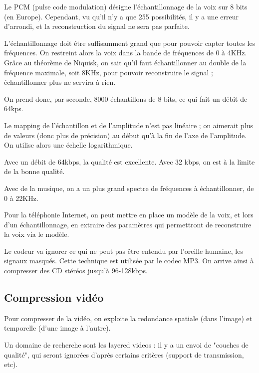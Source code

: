 		Le PCM (pulse code modulation) désigne l'échantillonnage de la voix sur 8 bits (en Europe). Cependant, vu qu'il n'y a que 255 possibilités, il y a une erreur d'arrondi, et la reconstruction du signal ne sera pas parfaite.
		
		L'échantillonnage doit être suffisamment grand que pour pouvoir capter toutes les fréquences. On restreint alors la voix dans la bande de fréquences de 0 à 4KHz. Grâce au théorème de Niquisk, on sait qu'il faut échantillonner au double de la fréquence maximale, soit 8KHz, pour pouvoir reconstruire le signal ; échantillonner plus ne servira à rien.
		
		On prend donc, par seconde, 8000 échantillons de 8 bits, ce qui fait un débit de 64kps.
		
		Le mapping de l'échantillon et de l'amplitude n'est pas linéaire ; on aimerait plus de valeurs (donc plus de précision) au début qu'à la fin de l'axe de l'amplitude. On utilise alors une échelle logarithmique.
		
		
		Avec un débit de 64kbps, la qualité est excellente. Avec 32 kbps, on est à la limite de la bonne qualité.
		
		Avec de la musique, on a un plus grand spectre de fréquences à échantillonner, de 0 à 22KHz.
		
		Pour la téléphonie Internet, on peut mettre en place un modèle de la voix, et lors d'un échantillonnage, en extraire des paramètres qui permettront de reconstruire la voix via le modèle. 
		
		
		Le codeur va ignorer ce qui ne peut pas être entendu par l'oreille humaine, les signaux masqués. Cette technique est utilisée par le codec MP3. On arrive ainsi à compresser des CD stéréos jusqu'à 96-128kbps.
		
		\subsection{Compression vidéo}
		
		Pour compresser de la vidéo, on exploite la redondance spatiale (dans l'image) et temporelle (d'une image à l'autre).
		
		Un domaine de recherche sont les layered videos : il y a un envoi de "couches de qualité", qui seront ignorées d'après certains critères (support de transmission, etc).
		
		
